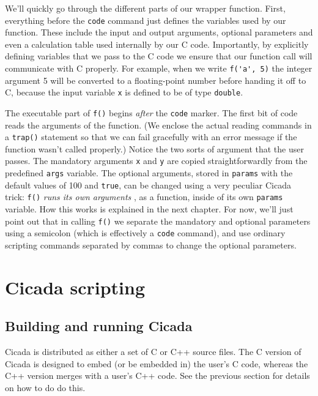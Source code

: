 \documentclass{article}
\begin{document}
We'll quickly go through the different parts of our wrapper function.  First, everything before the \verb#code# command just defines the variables used by our function.  These include the input and output arguments, optional parameters and even a calculation table used internally by our C code.  Importantly, by explicitly defining variables that we pass to the C code we ensure that our function call will communicate with C properly.  For example, when we write \verb#f('a', 5)# the integer argument 5 will be converted to a floating-point number before handing it off to C, because the input variable \verb#x# is defined to be of type \verb#double#.

The executable part of \verb#f()# begins \emph{after} the \verb#code# marker.  The first bit of code reads the arguments of the function.  (We enclose the actual reading commands in a \verb#trap()# statement so that we can fail gracefully with an error message if the function wasn't called properly.)  Notice the two sorts of argument that the user passes.  The mandatory arguments \verb#x# and \verb#y# are copied straightforwardly from the predefined \verb#args# variable.  The optional arguments, stored in \verb#params# with the default values of 100 and \verb#true#, can be changed using a very peculiar Cicada trick:  \verb#f()# \emph{runs its own arguments} , as a function, inside of its own \verb#params# variable.  How this works is explained in the next chapter.  For now, we'll just point out that in calling \verb#f()# we separate the mandatory and optional parameters using a semicolon (which is effectively a \verb#code# command), and use ordinary scripting commands separated by commas to change the optional parameters.

\newpage






\section{Cicada scripting}




\subsection{Building and running Cicada}

Cicada is distributed as either a set of C or C++ source files.  The C version of Cicada is designed to embed (or be embedded in) the user's C code, whereas the C++ version merges with a user's C++ code.  See the previous section for details on how to do do this.
\end{document}
